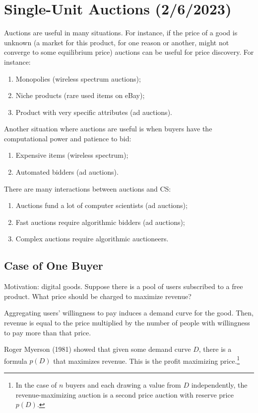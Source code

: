 \documentclass[dvipsnames]{article}
\theoremstyle{definition}
\theoremstyle{remark}
\begin{document}
\newpage

\section{Single-Unit Auctions (2/6/2023)}
Auctions are useful in many situations. For instance, if the price of a good is unknown (a market for this product, for one reason or another, might not converge to some equilibrium price) auctions can be useful for price discovery. For instance:
\begin{enumerate}
	\item Monopolies (wireless spectrum auctions);
	\item Niche products (rare used items on eBay);
	\item Product with very specific attributes (ad auctions).
\end{enumerate}
Another situation where auctions are useful is when buyers have the computational power and patience to bid:
\begin{enumerate}
	\item Expensive items (wireless spectrum);
	\item Automated bidders (ad auctions).
\end{enumerate}
There are many interactions between auctions and CS:
\begin{enumerate}
	\item Auctions fund a lot of computer scientists (ad auctions);
	\item Fast auctions require algorithmic bidders (ad auctions);
	\item Complex auctions require algorithmic auctioneers. 
\end{enumerate}

\subsection{Case of One Buyer}
Motivation: digital goods. Suppose there is a pool of users subscribed to a free product. What price should be charged to maximize revenue?

Aggregating users' willingness to pay induces a demand curve for the good. Then, revenue is equal to the price multiplied by the number of people with willingness to pay more than that price.

Roger Myerson (1981) showed that given some demand curve $D$, there is a formula $p(D)$ that maximizes revenue. This is the profit maximizing price.\footnote{In the case of $n$ buyers and each drawing a value from $D$ independently, the revenue-maximizing auction is a second price auction with reserve price $p(D)$.} 
\end{document}
